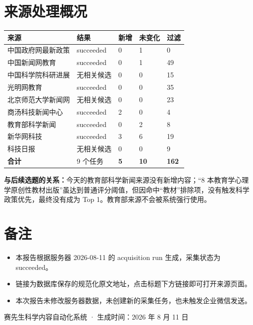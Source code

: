 \documentclass[UTF8,11pt,a4paper,fontset=none]{ctexart}
\begin{document}
\section{来源处理概况}

\renewcommand{\arraystretch}{1.3}
\begin{longtable}{L{3.8cm}L{2.2cm}L{1.3cm}L{1.7cm}L{1.6cm}}
\toprule
{}
\color{white}\bfseries\sffamily 来源 & \color{white}\bfseries\sffamily 结果 & \color{white}\bfseries\sffamily 新增 & \color{white}\bfseries\sffamily 未变化 & \color{white}\bfseries\sffamily 过滤 \\
\midrule
\endhead
中国政府网最新政策 & succeeded & 0 & 1 & 0 \\
 中国新闻网教育 & succeeded & 0 & 1 & 49 \\
中国科学院科研进展 & 无相关候选 & 0 & 0 & 15 \\
 光明网教育 & succeeded & 0 & 0 & 35 \\
北京师范大学新闻网 & 无相关候选 & 0 & 0 & 23 \\
 商汤科技新闻中心 & succeeded & 2 & 0 & 4 \\
教育部科学新闻 & succeeded & 0 & 2 & 8 \\
 新华网科技 & succeeded & 3 & 6 & 19 \\
科技日报 & 无相关候选 & 0 & 0 & 9 \\
\midrule
\textbf{合计} & 9 个任务 & \textbf{5} & \textbf{10} & \textbf{162} \\
\bottomrule
\end{longtable}

\begin{infobox}
\textbf{与后续选题的关系：}今天的教育部科学新闻来源没有新增内容；“8 本教育学心理学原创性教材出版”虽达到普通评分阈值，但因命中“教材”排除项，没有触发科学政策优先，最终没有成为 Top 1。教育部来源不会被系统强行使用。
\end{infobox}

\section{备注}

\begin{itemize}[leftmargin=1.6em,itemsep=0.35em]
  \item 本报告根据服务器 2026-08-11 的 acquisition run 生成，采集状态为 succeeded。
  \item 链接为数据库保存的规范化原文地址，点击标题下方链接即可打开来源页面。
  \item 本次报告未修改服务器数据，未创建新的采集任务，也未触发企业微信发送。
\end{itemize}

\vfill
\begin{center}
  {\small\color{muted}赛先生科学内容自动化系统 · 生成时间：2026 年 8 月 11 日}
\end{center}
\end{document}
